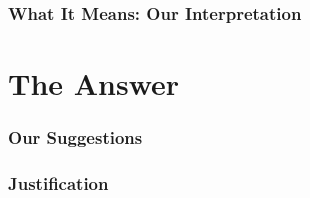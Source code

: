 \documentclass[]{report}
\begin{document}
	\section{What It Means: Our Interpretation}
	
\part{The Answer}
	\section{Our Suggestions}
	\section{Justification}
	
\end{document}
